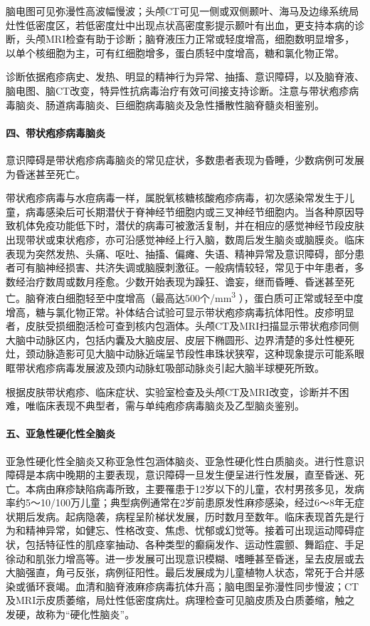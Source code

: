 脑电图可见弥漫性高波幅慢波；头颅CT可见一侧或双侧颞叶、海马及边缘系统局灶性低密度区，若低密度灶中出现点状高密度影提示颞叶有出血，更支持本病的诊断，头颅MRI检查有助于诊断；脑脊液压力正常或轻度增高，细胞数明显增多，以单个核细胞为主，可有红细胞增多，蛋白质轻中度增高，糖和氯化物正常。

诊断依据疱疹病史、发热、明显的精神行为异常、抽搐、意识障碍，以及脑脊液、脑电图、脑CT改变，特异性抗病毒治疗有效可间接支持诊断。注意与带状疱疹病毒脑炎、肠道病毒脑炎、巨细胞病毒脑炎及急性播散性脑脊髓炎相鉴别。

\paragraph{四、带状疱疹病毒脑炎}

意识障碍是带状疱疹病毒脑炎的常见症状，多数患者表现为昏睡，少数病例可发展为昏迷甚至死亡。

带状疱疹病毒与水痘病毒一样，属脱氧核糖核酸疱疹病毒，初次感染常发生于儿童，病毒感染后可长期潜伏于脊神经节细胞内或三叉神经节细胞内。当各种原因导致机体免疫功能低下时，潜伏的病毒可被激活复制，并在相应的感觉神经节段皮肤出现带状或束状疱疹，亦可沿感觉神经上行入脑，数周后发生脑炎或脑膜炎。临床表现为突然发热、头痛、呕吐、抽搐、偏瘫、失语、精神异常及意识障碍，部分患者可有脑神经损害、共济失调或脑膜刺激征。一般病情较轻，常见于中年患者，多数经治疗数周或数月痊愈。少数开始表现为躁狂、谵妄，继而昏睡、昏迷甚至死亡。脑脊液白细胞轻至中度增高（最高达500个/mm\textsuperscript{3}
），蛋白质可正常或轻至中度增高，糖与氯化物正常。补体结合试验可显示带状疱疹病毒抗体阳性。皮疹明显者，皮肤受损细胞活检可查到核内包涵体。头颅CT及MRI扫描显示带状疱疹同侧大脑中动脉区内，包括内囊及大脑皮层、皮层下椭圆形、边界清楚的多灶性梗死灶，颈动脉造影可见大脑中动脉近端呈节段性串珠状狭窄，这种现象提示可能系眼眶带状疱疹病毒发展波及颈内动脉虹吸部动脉炎引起大脑半球梗死所致。

根据皮肤带状疱疹、临床症状、实验室检查及头颅CT及MRI改变，诊断并不困难，唯临床表现不典型者，需与单纯疱疹病毒脑炎及乙型脑炎鉴别。

\paragraph{五、亚急性硬化性全脑炎}

亚急性硬化性全脑炎又称亚急性包涵体脑炎、亚急性硬化性白质脑炎。进行性意识障碍是本病中晚期的主要表现，意识障碍一旦发生便呈进行性发展，直至昏迷、死亡。本病由麻疹缺陷病毒所致，主要罹患于12岁以下的儿童，农村男孩多见，发病率约5～10/100万儿童；典型病例通常在2岁前患原发性麻疹感染，经过6～8年无症状期后发病。起病隐袭，病程呈阶梯状发展，历时数月至数年。临床表现首先是行为和精神异常，如健忘、性格改变、焦虑、忧郁或幻觉等。接着可出现运动障碍症状，包括特征性的肌痉挛抽动、各种类型的癫痫发作、运动性震颤、舞蹈症、手足徐动和肌张力增高等。进一步发展可出现意识模糊、嗜睡甚至昏迷，呈去皮层或去大脑强直，角弓反张，病例征阳性。最后发展成为儿童植物人状态，常死于合并感染或循环衰竭。血清和脑脊液麻疹病毒抗体升高；脑电图呈弥漫性同步慢波；CT及MRI示皮质萎缩，局灶性低密度病灶。病理检查可见脑皮质及白质萎缩，触之发硬，故称为“硬化性脑炎”。

